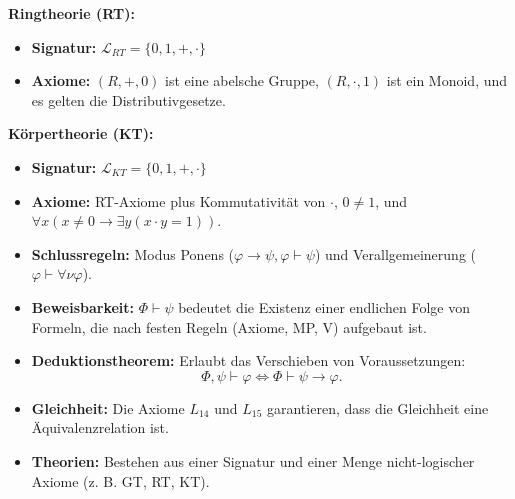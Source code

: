 \begin{math-stroke}
\textbf{Ringtheorie (RT):}
\begin{itemize}
    \item \textbf{Signatur:} $\mathcal{L}_{RT} = \{0, 1, +, \cdot\}$
    \item \textbf{Axiome:} $(R, +, 0)$ ist eine abelsche Gruppe, $(R, \cdot, 1)$ ist ein Monoid, und es gelten die Distributivgesetze.
\end{itemize}

\textbf{Körpertheorie (KT):}
\begin{itemize}
    \item \textbf{Signatur:} $\mathcal{L}_{KT} = \{0, 1, +, \cdot\}$
    \item \textbf{Axiome:} RT-Axiome plus Kommutativität von $\cdot$, $0 \neq 1$, und $\forall x (x \neq 0 \to \exists y (x \cdot y = 1))$.
\end{itemize}
\end{math-stroke}

\begin{nice-box}
\begin{itemize}
    \item \textbf{Schlussregeln:} Modus Ponens ($\varphi \to \psi, \varphi \vdash \psi$) und Verallgemeinerung ($\varphi \vdash \forall \nu \varphi$).
    \item \textbf{Beweisbarkeit:} $\Phi \vdash \psi$ bedeutet die Existenz einer endlichen Folge von Formeln, die nach festen Regeln (Axiome, MP, V) aufgebaut ist.
    \item \textbf{Deduktionstheorem:} Erlaubt das Verschieben von Voraussetzungen:
    \[ \Phi, \psi \vdash \varphi \iff \Phi \vdash \psi \to \varphi. \]
    \item \textbf{Gleichheit:} Die Axiome $L_{14}$ und $L_{15}$ garantieren, dass die Gleichheit eine Äquivalenzrelation ist.
    \item \textbf{Theorien:} Bestehen aus einer Signatur und einer Menge nicht-logischer Axiome (z. B. GT, RT, KT).
\end{itemize}
\end{nice-box}

